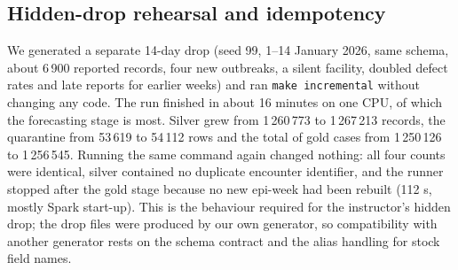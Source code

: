 \subsection{Hidden-drop rehearsal and idempotency}\label{sec:drop}
We generated a separate 14-day drop (seed 99, 1--14 January 2026, same schema, about 6\,900 reported records, four new outbreaks, a silent facility, doubled defect rates and late reports for earlier weeks) and ran \texttt{make incremental} without changing any code. The run finished in about 16 minutes on one CPU, of which the forecasting stage is most. Silver grew from 1\,260\,773 to 1\,267\,213 records, the quarantine from 53\,619 to 54\,112 rows and the total of gold cases from 1\,250\,126 to 1\,256\,545. Running the same command again changed nothing: all four counts were identical, silver contained no duplicate encounter identifier, and the runner stopped after the gold stage because no new epi-week had been rebuilt (112 s, mostly Spark start-up). This is the behaviour required for the instructor's hidden drop; the drop files were produced by our own generator, so compatibility with another generator rests on the schema contract and the alias handling for stock field names.
